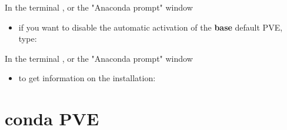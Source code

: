\documentclass[10pt,serif,mathserif,compress,hyperref={colorlinks}]{beamer}
\begin{document}
\begin{frame}{}
  
  \begin{tcolorbox}[title=\textbf{Miniconda3} post-Installation]
    {\footnotesize In the terminal , or the "Anaconda prompt" window \DarkGray{\footnotesize [Windows]}}
    \begin{itemize}
    \item if you want to disable the automatic activation of the \textbf{base} default PVE, type:\\
    \end{itemize}
  \end{tcolorbox}

  \begin{tcolorbox}[title=Info on the \textbf{conda} installation]    
    {\footnotesize In the terminal , or the "Anaconda prompt" window \DarkGray{\footnotesize[Windows]}}
    \begin{itemize}
    \item to get information on the  installation:\\
    \end{itemize}
  \end{tcolorbox}

  \vfill

\end{frame}

\section{conda PVE}
\end{document}
